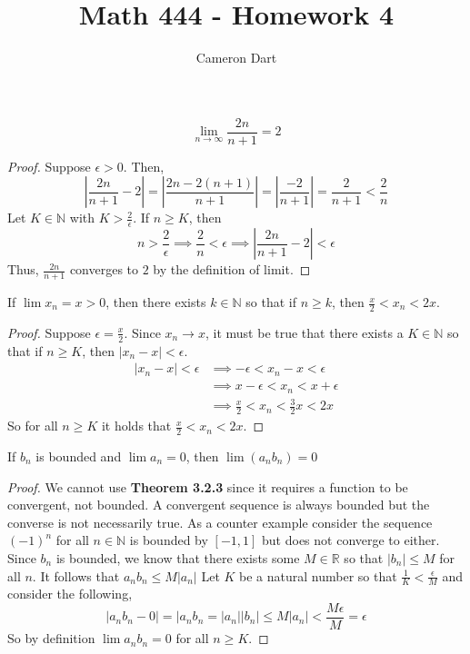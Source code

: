 \documentclass[12pt]{article}
\newcommand{\N}{\mathbb{N}}
\newcommand{\R}{\mathbb{R}}
\newenvironment{claim}[2][Claim]{\begin{trivlist}
		\item[\hskip \labelsep {\bfseries #1}\hskip \labelsep {\bfseries #2}]}{\end{trivlist}}
\begin{document}
	\title{Math 444 - Homework 4}
	\author{Cameron Dart}
	\maketitle

\begin{claim}{3.1.5b}
	$$\lim_{n\to\infty} \frac{2n}{n + 1} = 2$$
\end{claim}
\begin{proof}
	Suppose $\epsilon > 0$. Then, 
	\begin{equation}
		\left | \frac{2n}{n + 1} - 2\right | = \left | \frac{2n - 2(n + 1)}{n + 1} \right | = \left | \frac{-2}{n + 1}\right | = \frac{2}{n + 1} < \frac{2}{n}
	\end{equation}
	Let $K \in \N$ with $K > \frac{2}{\epsilon}$. If $n \geq K$, then
	\begin{equation}
		n > \frac{2}{\epsilon} \implies \frac{2}{n} < \epsilon \implies \left | \frac{2n}{n + 1} - 2\right | < \epsilon
	\end{equation}
	Thus, $ \frac{2n}{n + 1}$ converges to $2$ by the definition of limit.
\end{proof}

\begin{claim}{3.1.18}
	If $\lim x_n = x > 0$, then there exists $k \in \N$ so that if $n \geq k$, then $\frac{x}{2} < x_n < 2x$.
\end{claim}
\begin{proof}
	Suppose $\epsilon = \frac{x}{2}$. Since $x_n \rightarrow x$, it must be true that there exists a $K \in \N$ so that if $n \geq K$, then $\left | x_n - x \right | < \epsilon$.
	\begin{align*}
		\left | x_n - x \right | < \epsilon & \implies -\epsilon < x_n - x < \epsilon \\
		&\implies x - \epsilon < x_n < x + \epsilon \\
		& \implies \frac{x}{2} < x_n < \frac{3}{2}x < 2x
	\end{align*}
	So for all $n \geq K$ it holds that $\frac{x}{2} < x_n < 2x$.
\end{proof}

\newpage
\begin{claim}{3.2.7}
	If $b_n$ is bounded and $\lim a_n = 0$, then $\lim(a_n b_n) = 0$
\end{claim}
\begin{proof}
	We cannot use \textbf{Theorem 3.2.3} since it requires a function to be convergent, not bounded. A convergent sequence is always bounded but the converse is not necessarily true. As a counter example consider the sequence $(-1)^n$ for all $n \in \N$ is bounded by $[-1,1]$ but does not converge to either.\\
	Since $b_n$ is bounded, we know that there exists some $M \in \R$ so that $|b_n| \leq M$ for all $n$. It follows that $a_nb_n \leq M|a_n|$ Let $K$ be a natural number so that $\frac{1}{K} < \frac{\epsilon}{M}$ and consider the following,
	\begin{equation}
		| a_nb_n - 0| = |a_nb_n = |a_n| |b_n| \leq M|a_n| < \frac{M \epsilon}{M} = \epsilon
	\end{equation}
	So by definition $\lim a_nb_n = 0$ for all $n \geq K$.
\end{proof}
\end{document}
